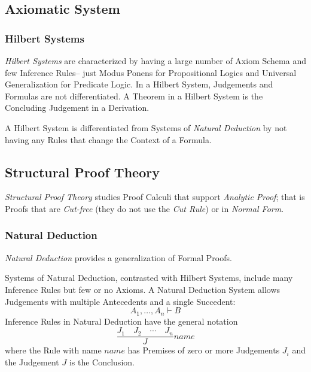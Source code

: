 \subsection{Axiomatic System} \label{sec:axiomatic_system}

\subsubsection{Hilbert Systems} \label{sec:hilbert_systems}

\emph{Hilbert Systems} are characterized by having a large number of
Axiom Schema and few Inference Rules-- just Modus Ponens for
Propositional Logics and Universal Generalization for Predicate
Logic. In a Hilbert System, Judgements and Formulas are not
differentiated. A Theorem in a Hilbert System is the Concluding
Judgement in a Derivation.

A Hilbert System is differentiated from Systems of \emph{Natural
 Deduction} by not having any Rules that change the Context of a
Formula.



\subsection{Structural Proof Theory}

\emph{Structural Proof Theory} studies Proof Calculi that support
\emph{Analytic Proof}; that is Proofs that are \emph{Cut-free} (they
do not use the \emph{Cut Rule}) or in \emph{Normal Form}.



\subsubsection{Natural Deduction}\label{sec:natural_deduction}

\emph{Natural Deduction}\cite{prawitz65} provides a generalization of
Formal Proofs.

Systems of Natural Deduction, contrasted with Hilbert Systems, include
many Inference Rules but few or no Axioms. A Natural Deduction System
allows Judgements with multiple Antecedents and a single Succedent:
\[
    A_1,\ldots,A_n \vdash B
\]
Inference Rules in Natural Deduction have the general notation
\[
    {
        \frac{J_1 \quad J_2 \quad \cdots \quad J_n}
        {J}
    } name
\]
where the Rule with name $name$ has Premises of zero or more
Judgements $J_i$ and the Judgement $J$ is the Conclusion.

